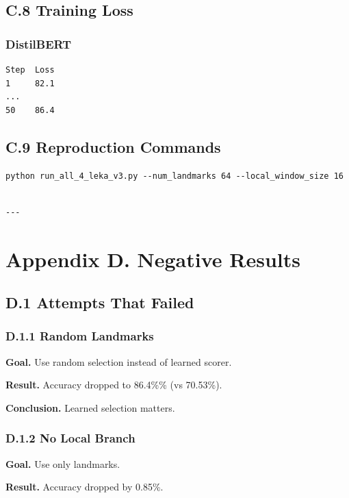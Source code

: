 \subsection{C.8 Training Loss}

\subsubsection{DistilBERT}
\begin{lstlisting}
Step  Loss
1     82.1
...
50    86.4
\end{lstlisting}

\subsection{C.9 Reproduction Commands}

\begin{lstlisting}
python run_all_4_leka_v3.py --num_landmarks 64 --local_window_size 16
\end{lstlisting}
\begin{lstlisting}

---
\end{lstlisting}

\section{Appendix D. Negative Results}

\subsection{D.1 Attempts That Failed}

\subsubsection{D.1.1 Random Landmarks}

\textbf{Goal.} Use random selection instead of learned scorer.

\textbf{Result.} Accuracy dropped to 86.4\%\% (vs 70.53\%).

\textbf{Conclusion.} Learned selection matters.

\subsubsection{D.1.2 No Local Branch}

\textbf{Goal.} Use only landmarks.

\textbf{Result.} Accuracy dropped by 0.85\%.

